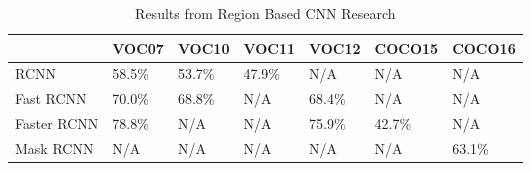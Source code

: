 \begin{table}[h]
    \centering
    \caption{Results from Region Based CNN Research}
    \label{rcnnResults}
    \begin{tabular}{|p{1.5cm}|l|l|l|l|l|l|}
    \hline
                    & \textbf{VOC07} & \textbf{VOC10} & \textbf{VOC11} & \textbf{VOC12} & \textbf{COCO15} &
                    \textbf{COCO16} \\ \hline
                    RCNN        & 58.5\%  & 53.7\%  & 47.9\%  & N/A     & N/A
                    & N/A      \\ \hline
                    Fast RCNN   & 70.0\%  & 68.8\%  & N/A     & 68.4\%  & N/A
                    & N/A      \\ \hline
                    Faster RCNN & 78.8\%  & N/A     & N/A     & 75.9\%  & 42.7\%
                    & N/A      \\ \hline
                    Mask RCNN   & N/A     & N/A     & N/A     & N/A     & N/A
                    & 63.1\%  \\ \hline
    \end{tabular}
\end{table}

